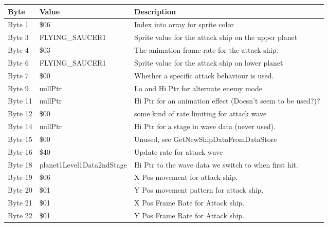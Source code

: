 \begin{figure}[H]
{\begin{adjustbox}{width=12cm}
\begin{tabular}{lll}
\toprule
 Byte    & Value                     & Description                                                        \\
\midrule
 Byte 1  & \$06                       & Index into array for sprite color                                  \\
 Byte 3  & FLYING\_SAUCER1            & Sprite value for the attack ship on the upper planet               \\
 Byte 4  & \$03                       & The animation frame rate for the attack ship.                      \\
 Byte 6  & FLYING\_SAUCER1            & Sprite value for the attack ship on lower planet                   \\
 Byte 7  & \$00                       & Whether a specific attack behaviour is used.                       \\
 Byte 9  & nullPtr                   & Lo and Hi Ptr for alternate enemy mode                             \\
 Byte 11 & nullPtr                   & Hi Ptr for an animation effect (Doesn't seem to be used?)?         \\
 Byte 12 & \$00                       & some kind of rate limiting for attack wave                         \\
 Byte 14 & nullPtr                   & Hi Ptr for a stage in wave data (never used).                      \\
 Byte 15 & \$00                       & Unused, see GetNewShipDataFromDataStore                            \\
 Byte 16 & \$40                       & Update rate for attack wave                                        \\
 Byte 18 & planet1Level1Data2ndStage & Hi Ptr to the wave data we switch to when first hit.               \\
 Byte 19 & \$06                       & X Pos movement for attack ship.                                    \\
 Byte 20 & \$01                       & Y Pos movement pattern for attack ship.                            \\
 Byte 21 & \$01                       & X Pos Frame Rate for Attack ship.                                  \\
 Byte 22 & \$01                       & Y Pos Frame Rate for Attack ship.                                  \\

\end{tabular}
\end{adjustbox}}
\end{figure}
